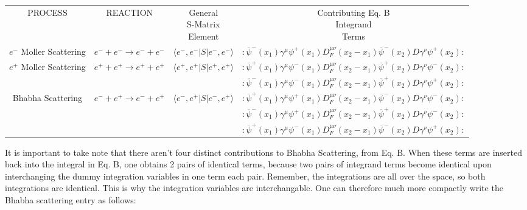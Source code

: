 \documentclass[a4]{article}
\begin{document}
    \begin{framed}
        \begin{tabular}{c c c c}
            PROCESS & REACTION & \shortstack{General \\ S-Matrix \\ Element} & \shortstack{Contributing Eq. B \\ Integrand \\ Terms} \\
            $e^{-}$ Moller Scattering & $e^{-} + e^{-} \rightarrow e^{-} + e^{-}$ & $\langle e^{-} , e^{-} | S | e^{-} , e^{-} \rangle$ & $:\overline{\psi}^{-} (x_1) \gamma^{\mu} \psi^{+} (x_1) D_{F}^{\mu\nu} (x_2 - x_1) \overline{\psi}^{-} (x_2) D \gamma^{\nu} \psi^{+} (x_2):$ \\
            $e^{+}$ Moller Scattering & $e^{+} + e^{+} \rightarrow e^{+} + e^{+}$ & $\langle e^{+} , e^{+} | S | e^{+} , e^{+} \rangle$ & $:\overline{\psi}^{+} (x_1) \gamma^{\mu} \psi^{-} (x_1) D_{F}^{\mu\nu} (x_2 - x_1) \overline{\psi}^{+} (x_2) D \gamma^{\nu} \psi^{-} (x_2):$ \\
            & & & $:\overline{\psi}^{-} (x_1) \gamma^{\mu} \psi^{-} (x_1) D_{F}^{\mu\nu} (x_2 - x_1) \overline{\psi}^{+} (x_2) D \gamma^{\nu} \psi^{+} (x_2):$ \\
        Bhabha Scattering & $e^{-} + e^{+} \rightarrow e^{-} + e^{+}$ & $\langle e^{-} , e^{+} | S | e^{-} , e^{+} \rangle$ & $:\overline{\psi}^{+} (x_1) \gamma^{\mu} \psi^{+} (x_1) D_{F}^{\mu\nu} (x_2 - x_1) \overline{\psi}^{-} (x_2) D \gamma^{\nu} \psi^{-} (x_2):$ \\
            & & & $:\overline{\psi}^{-} (x_1) \gamma^{\mu} \psi^{+} (x_1) D_{F}^{\mu\nu} (x_2 - x_1) \overline{\psi}^{+} (x_2) D \gamma^{\nu} \psi^{-} (x_2):$ \\
            & & & $:\overline{\psi}^{+} (x_1) \gamma^{\mu} \psi^{-} (x_1) D_{F}^{\mu\nu} (x_2 - x_1) \overline{\psi}^{-} (x_2) D \gamma^{\nu} \psi^{+} (x_2):$
        \end{tabular}
    \end{framed}

    It is important to take note that there aren't four distinct contributions to Bhabha Scattering, from Eq. B. When these terms are inserted back into the
    integral in Eq. B, one obtains 2 pairs of identical terms, because two pairs of integrand terms become identical upon interchanging the dummy integration
    variables in one term each pair. Remember, the integrations are all over the space, so both integrations are identical. This is why the integration
    variables are interchangable. One can therefore much more compactly write the Bhabha scattering entry as follows:
\end{document}
